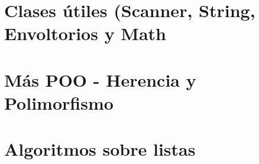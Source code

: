 \documentclass[12pt, twoside, openright]{report} %
\begin{document}
\part{Clases útiles (Scanner, String, Envoltorios y Math}



\part{Más POO - Herencia y Polimorfismo}



\part{Algoritmos sobre listas}





\end{document}
